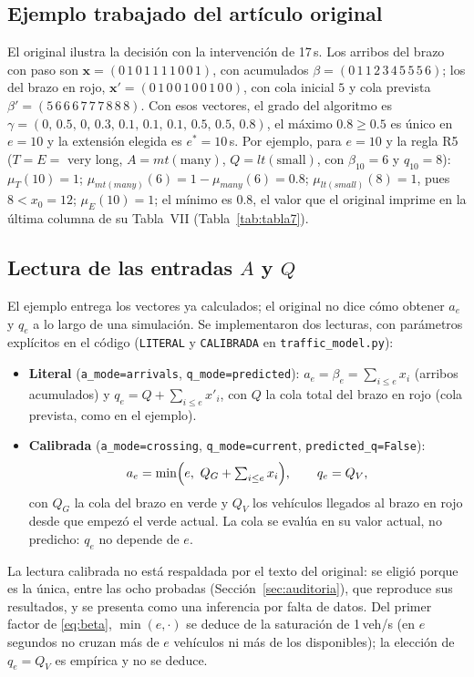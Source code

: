 \documentclass[journal]{IEEEtran}
\begin{document}
\subsection{Ejemplo trabajado del artículo original}
\label{sec:ejemplo}
El original ilustra la decisión con la intervención de 17\,s. Los arribos del brazo con paso son $\mathbf{x}=(0\,1\,0\,1\,1\,1\,1\,0\,0\,1)$, con acumulados $\beta=(0\,1\,1\,2\,3\,4\,5\,5\,5\,6)$; los del brazo en rojo, $\mathbf{x}'=(0\,1\,0\,0\,1\,0\,0\,1\,0\,0)$, con cola inicial $5$ y cola prevista $\beta'=(5\,6\,6\,6\,7\,7\,7\,8\,8\,8)$. Con esos vectores, el grado del algoritmo es $\gamma=(0,\,0.5,\,0,\,0.3,\,0.1,\,0.1,\,0.1,\,0.5,\,0.5,\,0.8)$, el máximo $0.8\ge0.5$ es único en $e=10$ y la extensión elegida es $e^*=10$\,s. Por ejemplo, para $e=10$ y la regla R5 ($T=E=$ very long, $A=mt(\text{many})$, $Q=lt(\text{small})$, con $\beta_{10}=6$ y $q_{10}=8$): $\mu_T(10)=1$; $\mu_{mt(many)}(6)=1-\mu_{many}(6)=0.8$; $\mu_{lt(small)}(8)=1$, pues $8<x_0=12$; $\mu_E(10)=1$; el mínimo es $0.8$, el valor que el original imprime en la última columna de su Tabla~VII (Tabla~\ref{tab:tabla7}).



\subsection{Lectura de las entradas $A$ y $Q$}
\label{sec:lecturas}
El ejemplo entrega los vectores ya calculados; el original no dice cómo obtener $a_e$ y $q_e$ a lo largo de una simulación. Se implementaron dos lecturas, con parámetros explícitos en el código (\texttt{LITERAL} y \texttt{CALIBRADA} en \texttt{traffic\_model.py}):
\begin{itemize}
\item \textbf{Literal} (\texttt{a\_mode=arrivals}, \texttt{q\_mode=predicted}): $a_e=\beta_e=\sum_{i\le e}x_i$ (arribos acumulados) y $q_e=Q+\sum_{i\le e}x'_i$, con $Q$ la cola total del brazo en rojo (cola prevista, como en el ejemplo).
\item \textbf{Calibrada} (\texttt{a\_mode=crossing}, \texttt{q\_mode=current}, \texttt{predicted\_q=False}):
\begin{equation}
a_e=\min\Bigl(e,\ Q_G+\textstyle\sum_{i\le e}x_i\Bigr),\qquad q_e=Q_V,
\label{eq:beta}
\end{equation}
con $Q_G$ la cola del brazo en verde y $Q_V$ los vehículos llegados al brazo en rojo desde que empezó el verde actual. La cola se evalúa en su valor actual, no predicho: $q_e$ no depende de $e$.
\end{itemize}
La lectura calibrada no está respaldada por el texto del original: se eligió porque es la única, entre las ocho probadas (Sección~\ref{sec:auditoria}), que reproduce sus resultados, y se presenta como una inferencia por falta de datos. Del primer factor de \eqref{eq:beta}, $\min(e,\cdot)$ se deduce de la saturación de 1\,veh/s (en $e$ segundos no cruzan más de $e$ vehículos ni más de los disponibles); la elección de $q_e=Q_V$ es empírica y no se deduce.
\end{document}

